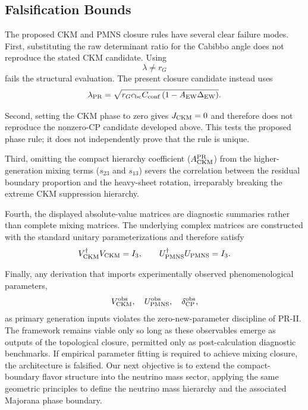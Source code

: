 \documentclass[11pt]{article}
\begin{document}
\subsection{Falsification Bounds}
\label{sec:pr2_ckm_pmns_negative_controls}

The proposed CKM and PMNS closure rules have several clear failure modes. First, substituting the raw determinant ratio for the Cabibbo angle does not reproduce the stated CKM candidate. Using
\begin{equation}
\lambda \neq r_G
\end{equation}
fails the structural evaluation. The present closure candidate instead uses
\begin{equation}
\lambda_{\rm PR}
=
\sqrt{
r_Gc_{\rm bc}C_{\rm conf}
\left(
1-A_{\rm EW}\Delta_{\rm EW}
\right)
}.
\end{equation}

Second, setting the CKM phase to zero gives \(J_{\rm CKM}=0\) and therefore does not reproduce the nonzero-CP candidate developed above. This tests the proposed phase rule; it does not independently prove that the rule is unique.

Third, omitting the compact hierarchy coefficient (\(A_{\rm CKM}^{\rm PR}\)) from the higher-generation mixing terms (\(s_{23}\) and \(s_{13}\)) severs the correlation between the residual boundary proportion and the heavy-sheet rotation, irreparably breaking the extreme CKM suppression hierarchy.

Fourth, the displayed absolute-value matrices are diagnostic summaries rather than complete mixing matrices. The underlying complex matrices are constructed with the standard unitary parameterizations and therefore satisfy
\begin{equation}
V_{\rm CKM}^\dagger V_{\rm CKM}=I_3,
\qquad
U_{\rm PMNS}^\dagger U_{\rm PMNS}=I_3.
\end{equation}

Finally, any derivation that imports experimentally observed phenomenological parameters,
\begin{equation}
V_{\rm CKM}^{\rm obs},
\quad
U_{\rm PMNS}^{\rm obs},
\quad
\delta_{\rm CP}^{\rm obs},
\end{equation}
as primary generation inputs violates the zero-new-parameter discipline of PR-II. The framework remains viable only so long as these observables emerge as outputs of the topological closure, permitted only as post-calculation diagnostic benchmarks. If empirical parameter fitting is required to achieve mixing closure, the architecture is falsified. Our next objective is to extend the compact-boundary flavor structure into the neutrino mass sector, applying the same geometric principles to define the neutrino mass hierarchy and the associated Majorana phase boundary.
\end{document}
